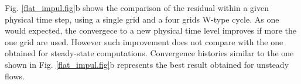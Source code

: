  Fig. \ref{flat_impul.fig}b shows the comparison of the
 residual within a given physical time step, using a single grid and a four grids
 W-type cycle. As one would expected, the convergece to a new physical time level
 improves if more the one grid are used. However such improvement does not
 compare with the one obtained for steady-state computations.
 Convergence histories similar to the one
 shown in Fig. \ref{flat_impul.fig}b represents the best result
 obtained for unsteady flows.
